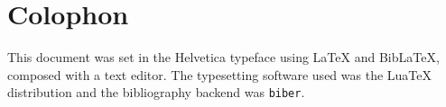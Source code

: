 \appendix

\chapter{Colophon}\label{sec:appendix}

This document was set in the Helvetica typeface using \LaTeX{} and Bib\LaTeX{}, composed with a text editor.
The typesetting software used was the Lua\TeX{} distribution and the bibliography backend was \texttt{biber}.


